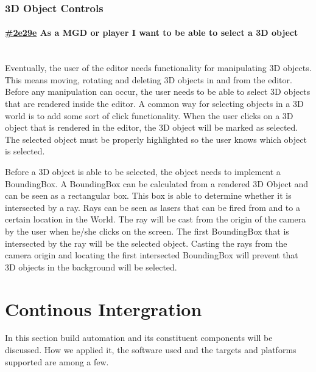 \documentclass[10pt]{extarticle} %
\newcommand{\myparagraph}[1]{\paragraph{#1}\mbox{}\\} %
\begin{document}
    \subsubsection{3D Object Controls}
    \myparagraph{\href{\clickup{2e29e}}{\#2e29e} As a MGD or player I want to be able to select a 3D object}
    Eventually, the user of the editor needs functionality for manipulating 3D objects.
    This means moving, rotating and deleting 3D objects in and from the editor.
    Before any manipulation can occur, the user needs to be able to select 3D objects that are rendered inside the editor.
    A common way for selecting objects in a 3D world is to add some sort of click functionality.
    When the user clicks on a 3D object that is rendered in the editor, the 3D object will be marked as selected.
    The selected object must be properly highlighted so the user knows which object is selected.

    Before a 3D object is able to be selected, the object needs to implement a BoundingBox.
    A BoundingBox can be calculated from a rendered 3D Object and can be seen as a rectangular box.
    This box is able to determine whether it is intersected by a ray.
    Rays can be seen as lasers that can be fired from and to a certain location in the World.
    The ray will be cast from the origin of the camera by the user when he/she clicks on the screen.
    The first BoundingBox that is intersected by the ray will be the selected object.
    Casting the rays from the camera origin and locating the first intersected BoundingBox will prevent that 3D objects in the background will be selected.

    \newpage
    \section{Continous Intergration}
    In this section build automation and its constituent components will be discussed.
    How we applied it, the software used and the targets and platforms supported are among a few.

    \newpage
    
\end{document}
